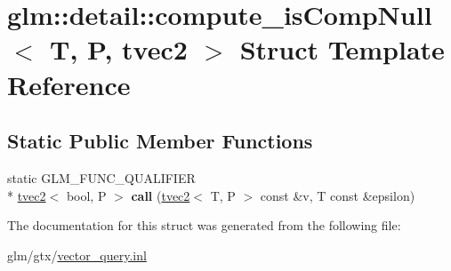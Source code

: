 \hypertarget{structglm_1_1detail_1_1compute__isCompNull_3_01T_00_01P_00_01tvec2_01_4}{\section{glm\-:\-:detail\-:\-:compute\-\_\-is\-Comp\-Null$<$ T, P, tvec2 $>$ Struct Template Reference}
\label{structglm_1_1detail_1_1compute__isCompNull_3_01T_00_01P_00_01tvec2_01_4}
}
\subsection*{Static Public Member Functions}
\begin{DoxyCompactItemize}
\item 
\hypertarget{structglm_1_1detail_1_1compute__isCompNull_3_01T_00_01P_00_01tvec2_01_4_ac0a15e2120dff188297158f1aa716a0e}{static G\-L\-M\-\_\-\-F\-U\-N\-C\-\_\-\-Q\-U\-A\-L\-I\-F\-I\-E\-R \\*
\hyperlink{structglm_1_1tvec2}{tvec2}$<$ bool, P $>$ {\bfseries call} (\hyperlink{structglm_1_1tvec2}{tvec2}$<$ T, P $>$ const \&v, T const \&epsilon)}\label{structglm_1_1detail_1_1compute__isCompNull_3_01T_00_01P_00_01tvec2_01_4_ac0a15e2120dff188297158f1aa716a0e}

\end{DoxyCompactItemize}


The documentation for this struct was generated from the following file\-:\begin{DoxyCompactItemize}
\item 
glm/gtx/\hyperlink{vector__query_8inl}{vector\-\_\-query.\-inl}\end{DoxyCompactItemize}
